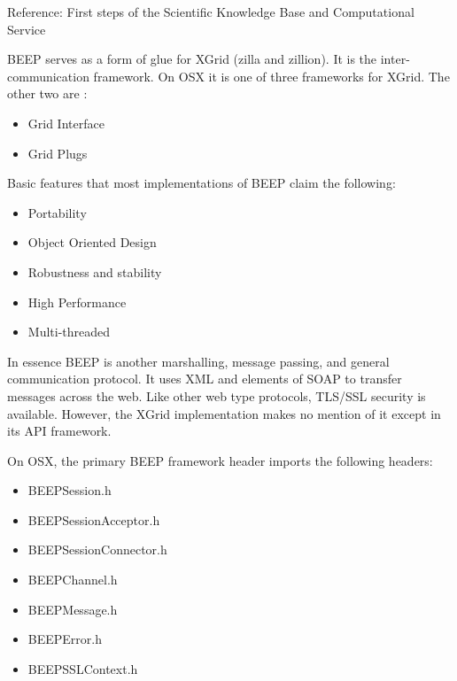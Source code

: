 Reference: First steps of the Scientific  Knowledge Base and Computational Service 

BEEP serves as a form of glue for XGrid (zilla and zillion).  It is the inter-communication framework.  On OSX it is one of three frameworks for XGrid.  The other two are :
\begin{itemize}
\item Grid Interface 
\item Grid Plugs
\end{itemize}

 Basic features that most implementations of BEEP claim the following:
 \begin{itemize}
\item Portability 
 \item Object Oriented Design
 \item Robustness and stability 
 \item High Performance
 \item Multi-threaded
\end{itemize}
In essence BEEP is another marshalling, message passing, and general communication protocol.  It uses XML and elements of SOAP to transfer messages across the web.  Like other web type protocols, TLS/SSL security is available.  However, the XGrid implementation makes no mention of it except in its API framework.  

On OSX, the primary BEEP framework header imports the following headers:
\begin{itemize}
\item BEEPSession.h
\item BEEPSessionAcceptor.h
\item BEEPSessionConnector.h
\item BEEPChannel.h
\item BEEPMessage.h
\item BEEPError.h
\item BEEPSSLContext.h
\end{itemize}

